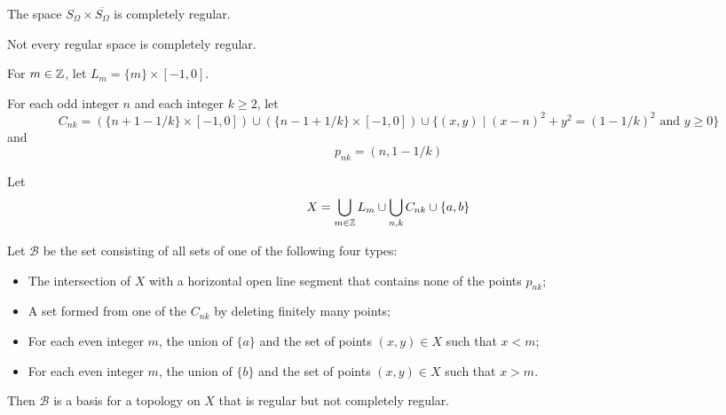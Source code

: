 \begin{example}
    The space $S_\Omega \times \overline{S_\Omega}$ is completely regular.
\end{example}

\begin{example}[Choice]
    Not every regular space is completely regular.
    
    For $m \in \mathbb{Z}$, let $L_m = \{ m \} \times [-1, 0]$.

    For each odd integer $n$ and each integer $k \geq 2$, let
    \[ C_{nk} = (\{ n + 1 - 1/k \} \times [-1, 0])
    \cup (\{n - 1 + 1/k\} \times [-1, 0])
    \cup \{ (x,y) \mid (x-n)^2 + y^2 = (1 - 1/k)^2 \text{ and } y \geq 0 \} \]
    and
    \[ p_{nk} = (n, 1 - 1/k) \]

    Let
    \[ X = \bigcup_{m \in \mathbb{Z}} L_m \cup \bigcup_{n,k} C_{nk} \cup \{ a, b \} \]

    Let $\mathcal{B}$ be the set consisting of all sets of one of the following
    four types:
    \begin{itemize}
        \item The intersection of $X$ with a horizontal open line segment that contains none
        of the points $p_{nk}$;
        \item A set formed from one of the $C_{nk}$ by deleting finitely many points;
        \item For each even integer $m$, the union of $\{a\}$ and the set of points
        $(x,y) \in X$ such that $x < m$;
        \item For each even integer $m$, the union of $\{b\}$ and the set of points
        $(x,y) \in X$ such that $x > m$.
    \end{itemize}

    Then $\mathcal{B}$ is a basis for a topology on $X$ that is regular but not completely regular.
    

\end{example}
